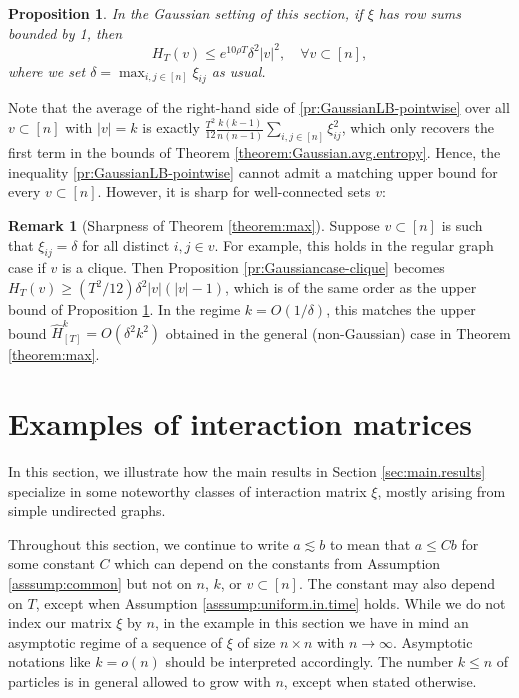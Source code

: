 \documentclass[11pt,reqno]{amsart}
\numberwithin{equation}{section}
\newtheorem{proposition}[theorem]{Proposition}
\theoremstyle{definition}
\newtheorem{remark}[theorem]{Remark}
\begin{document}
\begin{proposition} \label{pr:Gaussiancase-max}
In the Gaussian setting of this section, if $\xi$ has row sums bounded by 1, then 
\begin{equation}
H_T(v) \le e^{10 \rho T} \delta^2|v|^2, \quad \forall v \subset [n], \label{pr:GaussianUB-max}
\end{equation}
where we set $\delta=\max_{i,j \in [n]}\xi_{ij}$ as usual.
\end{proposition}

Note that the average of the right-hand side of \eqref{pr:GaussianLB-pointwise} over all $v \subset [n]$ with $|v|=k$ is exactly $\frac{T^2}{12}\frac{k(k-1)}{n(n-1)}\sum_{i,j \in [n]}\xi_{ij}^2$, which only recovers the first term in the bounds of Theorem \ref{theorem:Gaussian.avg.entropy}. Hence, the inequality \eqref{pr:GaussianLB-pointwise} cannot admit a matching upper bound for every $v \subset [n]$. However, it is sharp for well-connected sets $v$:

\begin{remark}[Sharpness of Theorem \ref{theorem:max}] \label{re:sharpness-max}
Suppose $v \subset [n]$ is such that $\xi_{ij}=\delta$ for all distinct $i,j \in v$. For example, this holds in the regular graph case if $v$ is a clique. Then Proposition \ref{pr:Gaussiancase-clique} becomes $H_T(v) \ge (T^2/12)\delta^2|v|(|v|-1)$, which is of the same order as the upper bound of Proposition \ref{pr:Gaussiancase-max}.
In the regime $k = O(1/\delta)$, this matches the  upper bound  $\widehat{H}^k_{[T]} = O(\delta^2 k^2)$ obtained in the general (non-Gaussian) case in Theorem \ref{theorem:max}.
\end{remark}
 


\section{Examples of interaction matrices} \label{sec:graph.examples}
In this section, we illustrate how the main results in Section \ref{sec:main.results} specialize in some noteworthy classes of interaction matrix $\xi$, mostly arising from simple undirected graphs.



Throughout this section, we continue to write $a \lesssim b$ to mean that $a \le Cb$ for some constant $C$ which can depend on the constants from Assumption \ref{asssump:common} but not on $n$, $k$, or $v \subset [n]$. The constant may also depend on $T$, except when Assumption \ref{asssump:uniform.in.time} holds.
While we do not index our matrix $\xi$ by $n$, in the example in this section we have in mind an asymptotic regime of a sequence of $\xi$ of size $n \times n$ with $n \to\infty$. Asymptotic notations like $k=o(n)$ should be interpreted accordingly. The number $k\le n$ of particles is in general allowed to grow with $n$, except when stated otherwise.
\end{document}
